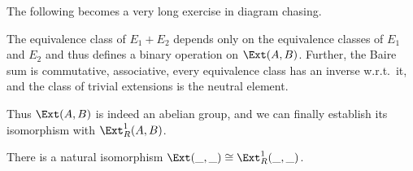 The following becomes a very long exercise in diagram chasing.
\begin{prop}
    The equivalence class of $E_1+E_2$ depends only on the equivalence classes of $E_1$ and $E_2$ and thus defines a binary operation on $\Ext(A,B)$. Further, the Baire sum is commutative, associative, every equivalence class has an inverse w.r.t.\ it, and the class of trivial extensions is the neutral element.
\end{prop}

Thus $\Ext(A,B)$ is indeed an abelian group, and we can finally establish its isomorphism with $\Ext_R^1(A,B)$.

\begin{thm}
    There is a natural isomorphism $\Ext(\_,\_)\cong\Ext^1_R(\_,\_)$.
\end{thm}
